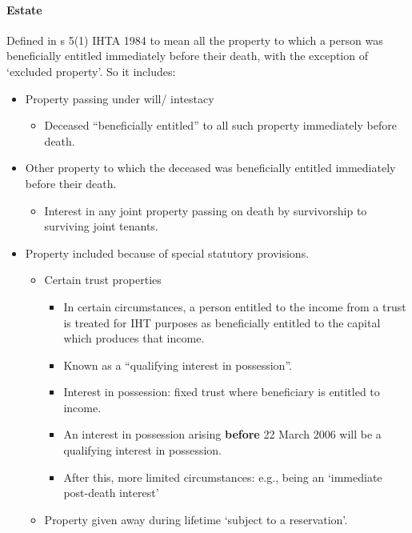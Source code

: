 \documentclass[
]{article}
\providecommand{\tightlist}{%
  \setlength{\itemsep}{0pt}\setlength{\parskip}{0pt}}
\begin{document}
\hypertarget{estate}{%
\paragraph{Estate}\label{estate}}

Defined in s 5(1) IHTA 1984 to mean all the property to which a person
was beneficially entitled immediately before their death, with the
exception of `excluded property'. So it includes:

\begin{itemize}
\tightlist
\item
  Property passing under will/ intestacy

  \begin{itemize}
  \tightlist
  \item
    Deceased ``beneficially entitled'' to all such property immediately
    before death.
  \end{itemize}
\item
  Other property to which the deceased was beneficially entitled
  immediately before their death.

  \begin{itemize}
  \tightlist
  \item
    Interest in any joint property passing on death by survivorship to
    surviving joint tenants.
  \end{itemize}
\item
  Property included because of special statutory provisions.

  \begin{itemize}
  \tightlist
  \item
    Certain trust properties

    \begin{itemize}
    \tightlist
    \item
      In certain circumstances, a person entitled to the income from a
      trust is treated for IHT purposes as beneficially entitled to the
      capital which produces that income.
    \item
      Known as a ``qualifying interest in possession''.
    \item
      Interest in possession: fixed trust where beneficiary is entitled
      to income.
    \item
      An interest in possession arising \textbf{before} 22 March 2006
      will be a qualifying interest in possession.
    \item
      After this, more limited circumstances: e.g., being an `immediate
      post-death interest'
    \end{itemize}
  \item
    Property given away during lifetime `subject to a reservation'.


\end{itemize}
\end{itemize}
\end{document}
